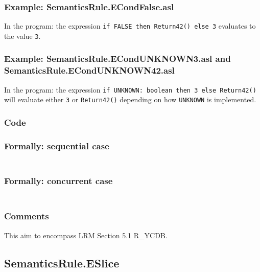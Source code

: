 \documentclass{book}
\begin{document}
  \subsubsection{Example: SemanticsRule.ECondFalse.asl}
    In the program:
    the expression \texttt{if FALSE then Return42() else 3} evaluates to the value \texttt{3}.

  \subsubsection{Example: SemanticsRule.ECondUNKNOWN3.asl and SemanticsRule.ECondUNKNOWN42.asl}
    In the program:
    the expression \texttt{if UNKNOWN: boolean then 3 else Return42()} will evaluate
    either \texttt{3} or \texttt{Return42()} depending on how \texttt{UNKNOWN} is implemented.

  \subsubsection{Code}

  \subsubsection{Formally: sequential case}
  \begin{align}
  \end{align} 

  \subsubsection{Formally: concurrent case}
  \begin{align}
  \end{align} 

  \subsubsection{Comments}
  This aim to encompass LRM Section 5.1 R\_YCDB.

\subsection{SemanticsRule.ESlice \label{sec:SemanticsRule.ESlice}}
\end{document}
